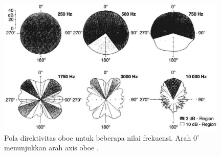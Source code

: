 \begin{figure}[t!]
    \centering
    \includegraphics[width=11cm]{Gambar/direktivitas-oboe.jpg}
    \caption{Pola direktivitas oboe untuk beberapa nilai frekuensi. Arah $0^\circ$ menunjukkan arah axis oboe \cite{meyer}.}
    \label{fig:direktivitas-oboe}
\end{figure}



